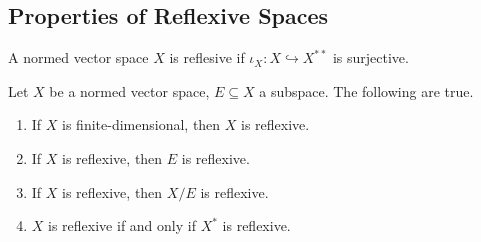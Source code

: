\documentclass[10pt]{mypackage}
\begin{document}
\subsection{Properties of Reflexive Spaces}%
\begin{definition}
  A normed vector space $X$ is reflesive if $\iota_X: X\hookrightarrow X^{\ast\ast}$ is surjective.
\end{definition}
\begin{proposition}
  Let $X$ be a normed vector space, $E\subseteq X$ a subspace. The following are true.
  \begin{enumerate}[(1)]
    \item If $X$ is finite-dimensional, then $X$ is reflexive.
    \item If $X$ is reflexive, then $E$ is reflexive.
    \item If $X$ is reflexive, then $X/E$ is reflexive.
    \item $X$ is reflexive if and only if $X^{\ast}$ is reflexive.
  \end{enumerate}
\end{proposition}
\end{document}
